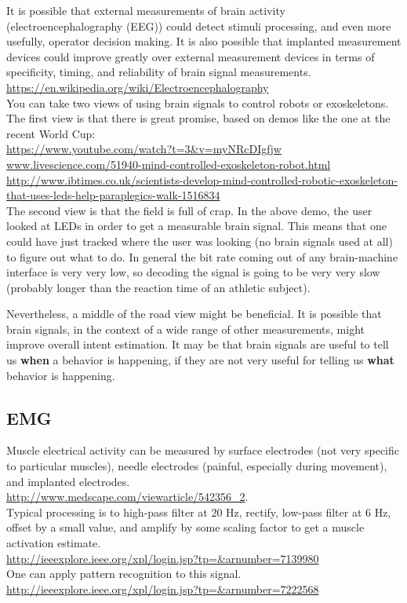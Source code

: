 \documentclass[letterpaper,12pt,fullpage]{article}
\begin{document}
It is possible that external measurements of brain activity
(electroencephalography (EEG)) could detect stimuli processing, and
even more usefully, operator decision making.
It is also possible that implanted measurement devices could improve
greatly over external measurement devices in terms of specificity,
timing, and reliability of brain signal measurements.\\
\url{https://en.wikipedia.org/wiki/Electroencephalography}\\

You can take two views of using brain signals to control robots or
exoskeletons.
The first view is that there is great promise, based on demos like
the one at the recent World Cup:\\
\url{https://www.youtube.com/watch?t=3&v=myNRcDIgfjw}\\
\url{www.livescience.com/51940-mind-controlled-exoskeleton-robot.html}\\
\url{http://www.ibtimes.co.uk/scientists-develop-mind-controlled-robotic-exoskeleton-that-uses-leds-help-paraplegics-walk-1516834}\\

The second view is that the field is full of crap. In the above demo,
the user looked at LEDs in order to get a measurable brain signal.
This means that one could have just tracked where the user was looking
(no brain signals used at all) to figure out what to do.
In general the bit rate coming out of any brain-machine interface is
very very low, so decoding the signal is going to be very very slow
(probably longer than the reaction time of an athletic subject).

Nevertheless, a middle of the road view might be beneficial. It is possible
that brain signals,
in the context of a wide range of other measurements,
might improve overall intent estimation.
It may be that brain signals are useful to tell us {\bf when} a behavior
is happening, if they are not very useful for telling us {\bf what}
behavior is happening.

\subsection{EMG}

Muscle electrical activity can be measured by surface electrodes
(not very specific to particular muscles), needle electrodes (painful,
especially during movement), and implanted electrodes.\\
\url{http://www.medscape.com/viewarticle/542356_2}.\\
Typical processing is to 
high-pass filter at 20 Hz, rectify, low-pass filter at 6 Hz,
offset by a small value, and amplify by some scaling factor
to get a muscle activation estimate.\\
\url{http://ieeexplore.ieee.org/xpl/login.jsp?tp=&arnumber=7139980}\\
One can apply pattern recognition to this signal.\\
\url{http://ieeexplore.ieee.org/xpl/login.jsp?tp=&arnumber=7222568}\\
\end{document}
